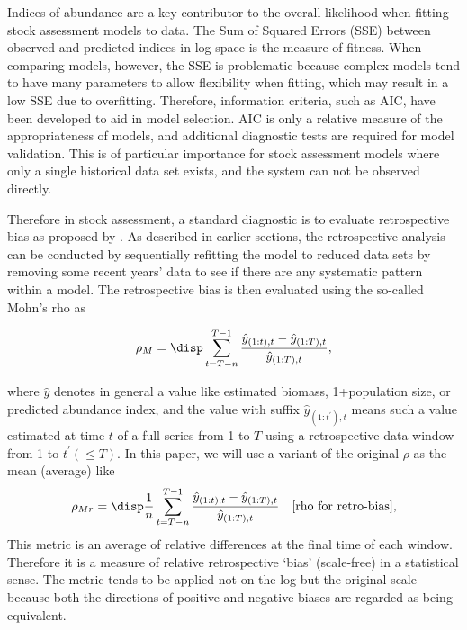 Indices of abundance are a key contributor to the overall likelihood when fitting stock assessment models to data. The Sum of Squared Errors (SSE) between observed and predicted indices in log-space is the measure of fitness. When comparing models, however, the SSE is problematic because complex models tend to have many parameters to allow flexibility when fitting, which may result in a low SSE due to overfitting. Therefore, information criteria, such as AIC, have been developed to aid in model selection. AIC is only a relative measure of the appropriateness of models, and additional diagnostic tests are required for model validation. This is of particular importance for stock assessment models where only a single historical data set exists, and the system can not be observed directly.

Therefore in stock assessment, a standard diagnostic is to evaluate retrospective bias as proposed by \cite{mohn1999retrospective}. As described in earlier sections, the retrospective analysis can be conducted by sequentially refitting the model to reduced data sets by removing some recent years' data to see if there are any systematic pattern within a model. The retrospective bias is then evaluated using the so-called Mohn's rho as 

\begin{equation}
\label{eqn:mohn0}
\rho_M = \disp \sum_{t=T-n}^{T-1} \frac{\hat{y}_{(1:t),t}-\hat{y}_{(1:T),t}}{\hat{y}_{(1:T),t}}, 
\end{equation}

where $\hat{y}$ denotes in general a value like estimated biomass, 1+population size, or predicted abundance index, and the value with suffix $\hat{y}_{(1:t^\prime),t}$ means such a value estimated at time $t$ of a full series from 1 to $T$ using a retrospective data window from 1 to $t^\prime (\leq T)$. In this paper, we will use a variant of the original $\rho$ as the mean (average) like 
\begin{equation}
\label{eqn:mohn}
\rho_{Mr} = \disp \frac{1}{n} \sum_{t=T-n}^{T-1} \frac{\hat{y}_{(1:t),t}-\hat{y}_{(1:T),t}}{\hat{y}_{(1:T),t}} 
\quad \mbox{[rho for retro-bias]}, 
\end{equation}
This metric is an average of relative differences at the final time of each window. Therefore it is a measure of relative retrospective `bias' (scale-free) in a statistical sense. The metric tends to be applied not on the log but the original scale because both the directions of positive and negative biases are regarded as being equivalent. 

